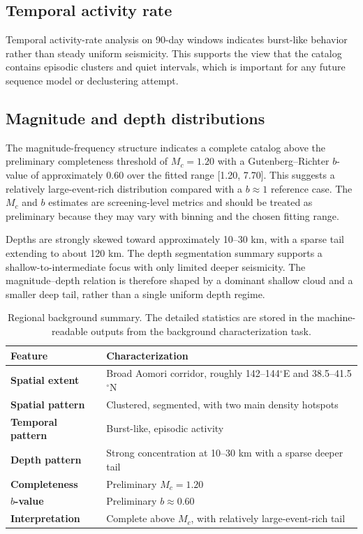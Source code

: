 \documentclass[11pt]{article}
\begin{document}
\subsection{Temporal activity rate}
Temporal activity-rate analysis on 90-day windows indicates burst-like behavior rather than steady uniform seismicity. This supports the view that the catalog contains episodic clusters and quiet intervals, which is important for any future sequence model or declustering attempt.

\subsection{Magnitude and depth distributions}
The magnitude-frequency structure indicates a complete catalog above the preliminary completeness threshold of $M_c = 1.20$ with a Gutenberg--Richter $b$-value of approximately 0.60 over the fitted range [1.20, 7.70]. This suggests a relatively large-event-rich distribution compared with a $b \approx 1$ reference case. The $M_c$ and $b$ estimates are screening-level metrics and should be treated as preliminary because they may vary with binning and the chosen fitting range.

Depths are strongly skewed toward approximately 10--30 km, with a sparse tail extending to about 120 km. The depth segmentation summary supports a shallow-to-intermediate focus with only limited deeper seismicity. The magnitude--depth relation is therefore shaped by a dominant shallow cloud and a smaller deep tail, rather than a single uniform depth regime.

\begin{table}[H]
\centering
\caption{Regional background summary. The detailed statistics are stored in the machine-readable outputs from the background characterization task.}
\begin{tabularx}{\textwidth}{>{\bfseries}l X}
\toprule
Feature & Characterization \\
\midrule
Spatial extent & Broad Aomori corridor, roughly 142--144$^{\circ}$E and 38.5--41.5$^{\circ}$N \\
Spatial pattern & Clustered, segmented, with two main density hotspots \\
Temporal pattern & Burst-like, episodic activity \\
Depth pattern & Strong concentration at 10--30 km with a sparse deeper tail \\
Completeness & Preliminary $M_c = 1.20$ \\
$b$-value & Preliminary $b \approx 0.60$ \\
Interpretation & Complete above $M_c$, with relatively large-event-rich tail \\
\bottomrule
\end{tabularx}
\end{table}
\end{document}
